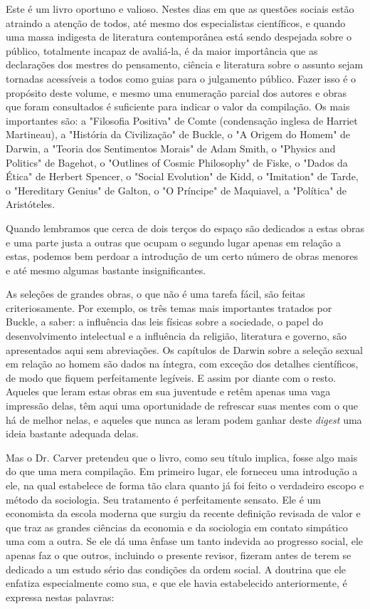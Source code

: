 \documentclass[12pt]{article}
\begin{document}
Este é um livro oportuno e valioso. Nestes dias em que as questões sociais estão atraindo a atenção de todos, até mesmo dos especialistas científicos, e quando uma massa indigesta de literatura contemporânea está sendo despejada sobre o público, totalmente incapaz de avaliá-la, é da maior importância que as declarações dos mestres do pensamento, ciência e literatura sobre o assunto sejam tornadas acessíveis a todos como guias para o julgamento público. Fazer isso é o propósito deste volume, e mesmo uma enumeração parcial dos autores e obras que foram consultados é suficiente para indicar o valor da compilação. Os mais importantes são: a "Filosofia Positiva" de Comte (condensação inglesa de Harriet Martineau), a "História da Civilização" de Buckle, o "A Origem do Homem" de Darwin, a "Teoria dos Sentimentos Morais" de Adam Smith, o "Physics and Politics" de Bagehot, o "Outlines of Cosmic Philosophy" de Fiske, o "Dados da Ética" de Herbert Spencer, o "Social Evolution" de Kidd, o "Imitation" de Tarde, o "Hereditary Genius" de Galton, o "O Príncipe" de Maquiavel, a "Política" de Aristóteles.

Quando lembramos que cerca de dois terços do espaço são dedicados a estas obras e uma parte justa a outras que ocupam o segundo lugar apenas em relação a estas, podemos bem perdoar a introdução de um certo número de obras menores e até mesmo algumas bastante insignificantes.

As seleções de grandes obras, o que não é uma tarefa fácil, são feitas criteriosamente. Por exemplo, os três temas mais importantes tratados por Buckle, a saber: a influência das leis físicas sobre a sociedade, o papel do desenvolvimento intelectual e a influência da religião, literatura e governo, são apresentados aqui sem abreviações. Os capítulos de Darwin sobre a seleção sexual em relação ao homem são dados na íntegra, com exceção dos detalhes científicos, de modo que fiquem perfeitamente legíveis. E assim por diante com o resto. Aqueles que leram estas obras em sua juventude e retêm apenas uma vaga impressão delas, têm aqui uma oportunidade de refrescar suas mentes com o que há de melhor nelas, e aqueles que nunca as leram podem ganhar deste \textit{digest} uma ideia bastante adequada delas.

Mas o Dr. Carver pretendeu que o livro, como seu título implica, fosse algo mais do que uma mera compilação. Em primeiro lugar, ele forneceu uma introdução a ele, na qual estabelece de forma tão clara quanto já foi feito o verdadeiro escopo e método da sociologia. Seu tratamento é perfeitamente sensato. Ele é um economista da escola moderna que surgiu da recente definição revisada de valor e que traz as grandes ciências da economia e da sociologia em contato simpático uma com a outra. Se ele dá uma ênfase um tanto indevida ao progresso social, ele apenas faz o que outros, incluindo o presente revisor, fizeram antes de terem se dedicado a um estudo sério das condições da ordem social. A doutrina que ele enfatiza especialmente como sua, e que ele havia estabelecido anteriormente, é expressa nestas palavras:
\end{document}
